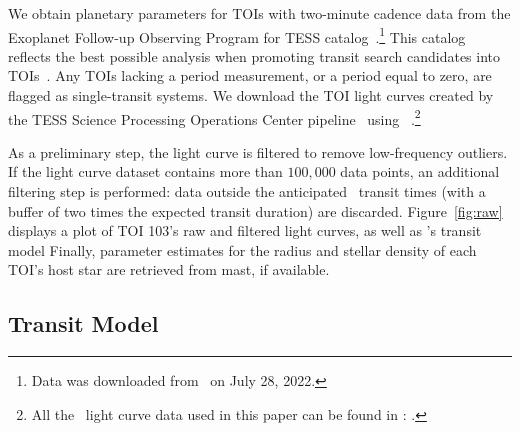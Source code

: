 \documentclass[floatfix,ApJL,twocolumn]{aastex631}
\begin{document}
We obtain planetary parameters for \numTessCandidates TOIs with two-minute cadence data from the Exoplanet Follow-up Observing Program for TESS catalog~\citep[\exofop][]{Guerrero:2021:ApJS}.\footnote{Data was downloaded from \exofopLink\ on July 28, 2022.}
This catalog reflects the best possible analysis when promoting transit search candidates into TOIs~\citep{Guerrero:2021:ApJS}.
Any TOIs lacking a period measurement, or a period equal to zero, are flagged as single-transit systems.
We download the TOI light curves created by the TESS Science Processing Operations Center pipeline~\citep{Jenkins:2016:SPIE, Jenkins:2021:tsc2} using \lightkurve~\citep{LightkurveCollaboration:2018:ascl}.\footnote{All the \tess\ light curve data used in this paper can be found in \mast: \mastDatabase.}

As a preliminary step, the light curve is filtered to remove low-frequency outliers.
If the light curve dataset contains more than $100,000$ data points, an additional filtering step is performed: data outside the anticipated \exofop\ transit times (with a buffer of two times the expected transit duration) are discarded.
Figure~\ref{fig:raw} displays a plot of {TOI 103}'s raw and filtered light curves, as well as \exofop's transit model
Finally, parameter estimates for the radius and stellar density of each TOI's host star are retrieved from mast, if available.



\subsection{Transit Model}
\end{document}

